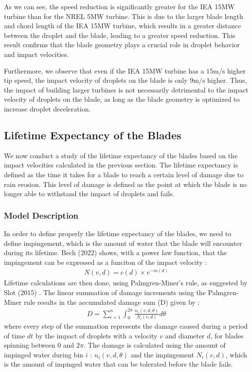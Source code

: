 \documentclass[10pt]{report}
\begin{document}
As we can see, the speed reduction is significantly greater for the IEA 15MW turbine than for the NREL 5MW turbine. This is due to the larger blade length and chord length of the IEA 15MW turbine, which results in a greater distance between the droplet and the blade, leading to a greater speed reduction. This result confirms that the blade geometry plays a crucial role in droplet behavior and impact velocities.

Furthermore, we observe that even if the IEA 15MW turbine has a $15 \mathrm{m/s}$ higher tip speed, the impact velocity of droplets on the blade is only $9 \mathrm{m/s}$ higher. Thus, the impact of building larger turbines is not necessarily detrimental to the impact velocity of droplets on the blade, as long as the blade geometry is optimized to increase droplet deceleration.
\subsection*{Lifetime Expectancy of the Blades}
We now conduct a study of the lifetime expectancy of the blades based on the impact velocities calculated in the previous section. The lifetime expectancy is defined as the time it takes for a blade to reach a certain level of damage due to rain erosion. This level of damage is defined as the point at which the blade is no longer able to withstand the impact of droplets and fails.
\subsubsection*{Model Description}
In order to define properly the lifetime expectancy of the blades, we need to define impingement, which is the amount of water that the blade will encounter during its lifetime. Bech (2022) \cite{Bech2022} shows, with a power law function, that the impingement can be expressed as a funciton of the impact velocity :
\begin{align}
    N(v,d) = c(d)\times v^{-m(d)}
\end{align}
Lifetime calculations are then done, using Palmgren-Miner’s rule, as suggested by Slot (2015) \cite{SLOT2015837}. The linear summation of damage increments using the Palmgren-Miner rule results in the accumulated damage sum (D) given by :
\begin{align}
    D = \sum_{i=1}^{n} \int_{0}^{2\pi} \frac{n_i(v,d,\theta)}{N_i(v,d)} d\theta
\end{align}
where every step of the summation represents the damage caused during a period of time $dt$ by the impact of droplets with a velocity $v$ and diameter $d$, for blades spinning between $0$ and $2\pi$. The damage is calculated using the amount of impinged water during bin $i$ : $n_i(v,d,\theta)$ and the impingement $N_i(v,d)$, which is the amount of impinged water that can be tolerated before the blade fails.
\end{document}
